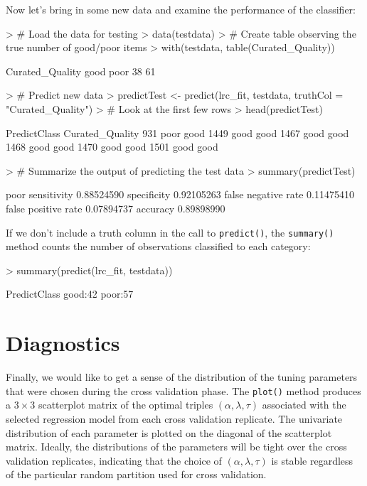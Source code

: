 \documentclass{article}
\begin{document}
\noindent Now let's bring in some new data and examine the performance of the classifier:
\begin{Schunk}
\begin{Sinput}
> # Load the data for testing
> data(testdata)
> # Create table observing the true number of good/poor items 
> with(testdata, table(Curated_Quality))
\end{Sinput}
\begin{Soutput}
Curated_Quality
good poor 
  38   61 
\end{Soutput}
\begin{Sinput}
> # Predict new data
> predictTest <- predict(lrc_fit, testdata, truthCol = "Curated_Quality")
> # Look at the first few rows
> head(predictTest)
\end{Sinput}
\begin{Soutput}
     PredictClass Curated_Quality
931          poor            good
1449         good            good
1467         good            good
1468         good            good
1470         good            good
1501         good            good
\end{Soutput}
\begin{Sinput}
> # Summarize the output of predicting the test data
> summary(predictTest)
\end{Sinput}
\begin{Soutput}
                          poor
sensitivity         0.88524590
specificity         0.92105263
false negative rate 0.11475410
false positive rate 0.07894737
accuracy            0.89898990
\end{Soutput}
\end{Schunk}
\noindent If we don't include a truth column in the call to {\tt predict()}, the {\tt summary()} method 
counts the number of observations classified to each category:
\begin{Schunk}
\begin{Sinput}
> summary(predict(lrc_fit, testdata))
\end{Sinput}
\begin{Soutput}
 PredictClass
 good:42     
 poor:57     
\end{Soutput}
\end{Schunk}


\section{Diagnostics}

\noindent Finally, we would like to get a sense of the distribution of the tuning parameters that were chosen 
during the cross validation phase. The {\tt plot()} method produces a $3 \times 3$ scatterplot matrix of the optimal 
triples $\left(\alpha, \lambda, \tau\right)$ associated with the selected regression model from each cross 
validation replicate. The univariate distribution of each parameter is plotted on the diagonal of the 
scatterplot matrix.  Ideally, the distributions of the parameters will be tight over the cross validation 
replicates, indicating that the choice of $\left(\alpha, \lambda, \tau\right)$ is stable regardless of
the particular random partition used for cross validation.
\end{document}
